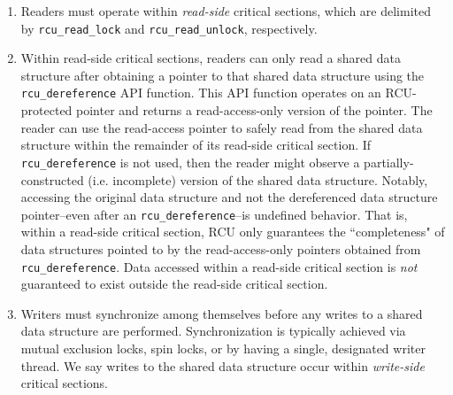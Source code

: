\documentclass[preprint]{sigplanconf}
\begin{document}
\begin{enumerate}
	
	\item Readers must operate within \emph{read-side} critical sections, which are delimited by \texttt{rcu\_read\_lock} and \texttt{rcu\_read\_unlock}, respectively.
	
	\item Within read-side critical sections, readers can only read a shared data structure after obtaining a pointer to that shared data structure using the \texttt{rcu\_dereference} API function. This API function operates on an RCU-protected pointer and returns a read-access-only version of the pointer.  The reader can use the read-access pointer to safely read from the shared data structure within the remainder of its read-side critical section. If \texttt{rcu\_dereference} is not used, then the reader might observe a partially-constructed (i.e. incomplete) version of the shared data structure. Notably, accessing the original data structure and not the dereferenced data structure pointer--even after an \texttt{rcu\_dereference}--is undefined behavior. That is, within a read-side critical section, RCU only guarantees the ``completeness" of data structures pointed to by the read-access-only pointers obtained from  \texttt{rcu\_dereference}. Data accessed within a read-side critical section is \emph{not} guaranteed to exist outside the read-side critical section.

	\item Writers must synchronize among themselves before any writes to a shared data structure are performed. Synchronization is typically achieved via mutual exclusion locks, spin locks, or by having a single, designated writer thread. We say writes to the shared data structure occur within \emph{write-side} critical sections.



\end{enumerate}
\end{document}
